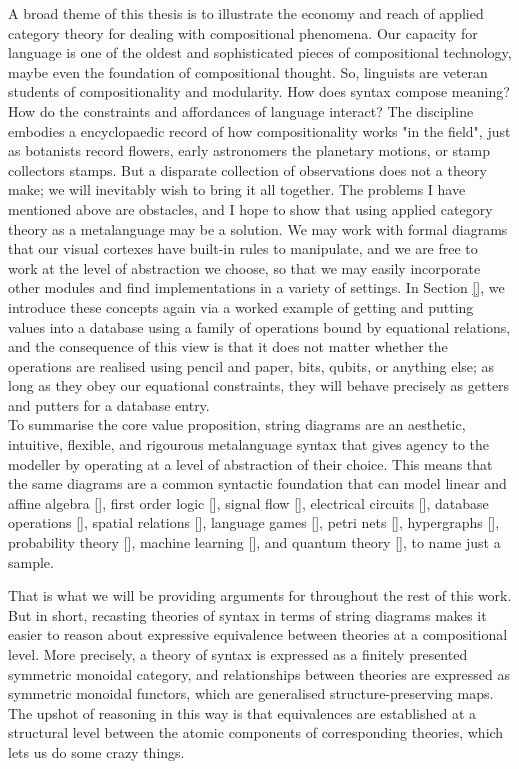 A broad theme of this thesis is to illustrate the economy and reach of applied category theory for dealing with compositional phenomena. Our capacity for language is one of the oldest and sophisticated pieces of compositional technology, maybe even the foundation of compositional thought. So, linguists are veteran students of compositionality and modularity. How does syntax compose meaning? How do the constraints and affordances of language interact? The discipline embodies a encyclopaedic record of how compositionality works "in the field", just as botanists record flowers, early astronomers the planetary motions, or stamp collectors stamps. But a disparate collection of observations does not a theory make; we will inevitably wish to bring it all together. The problems I have mentioned above are obstacles, and I hope to show that using applied category theory as a metalanguage may be a solution. We may work with formal diagrams that our visual cortexes have built-in rules to manipulate, and we are free to work at the level of abstraction we choose, so that we may easily incorporate other modules and find implementations in a variety of settings. In Section \ref{}, we introduce these concepts again via a worked example of getting and putting values into a database using a family of operations bound by equational relations, and the consequence of this view is that it does not matter whether the operations are realised using pencil and paper, bits, qubits, or anything else; as long as they obey our equational constraints, they will behave precisely as getters and putters for a database entry.\\

To summarise the core value proposition, string diagrams are an aesthetic, intuitive, flexible, and rigourous metalanguage syntax that gives agency to the modeller by operating at a level of abstraction of their choice. This means that the same diagrams are a common syntactic foundation that can model linear and affine algebra [], first order logic [], signal flow [], electrical circuits [], database operations [], spatial relations [], language games [], petri nets [], hypergraphs [], probability theory [], machine learning [], and quantum theory [], to name just a sample.


That is what we will be providing arguments for throughout the rest of this work. But in short, recasting theories of syntax in terms of string diagrams makes it easier to reason about expressive equivalence between theories at a compositional level. More precisely, a theory of syntax is expressed as a finitely presented symmetric monoidal category, and relationships between theories are expressed as symmetric monoidal functors, which are generalised structure-preserving maps. The upshot of reasoning in this way is that equivalences are established at a structural level between the atomic components of corresponding theories, which lets us do some crazy things.\\

